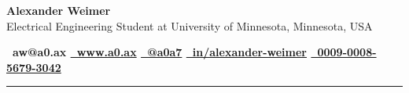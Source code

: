 \documentclass[
	12pt, %
]{letter}
\begin{document}

\vspace*{-1.25cm} %

\begin{center}
\vspace{0.5em}
\color{black}\LARGE{\textbf{Alexander Weimer}} \\
\vspace{0.3em}
\small{Electrical Engineering Student at University of Minnesota, Minnesota, USA} \\
\vspace{0.3em}

\small{\textbf{
  ~aw@a0.ax
  \quad
  \href{https://a0.ax/}{~www.a0.ax}
  \quad
  \href{https://github.com/a0a7}{~@a0a7}
  \quad
  \href{https://linkedin.com/in/alexander-weimer}{~in/alexander-weimer}
  \quad
  \href{https://orcid.org/0009-0008-5679-3042}{~0009-0008-5679-3042}
}}
\end{center}

\vspace{0.3cm} %

\rule{\linewidth}{1pt} %

\medskip %

\end{document}
